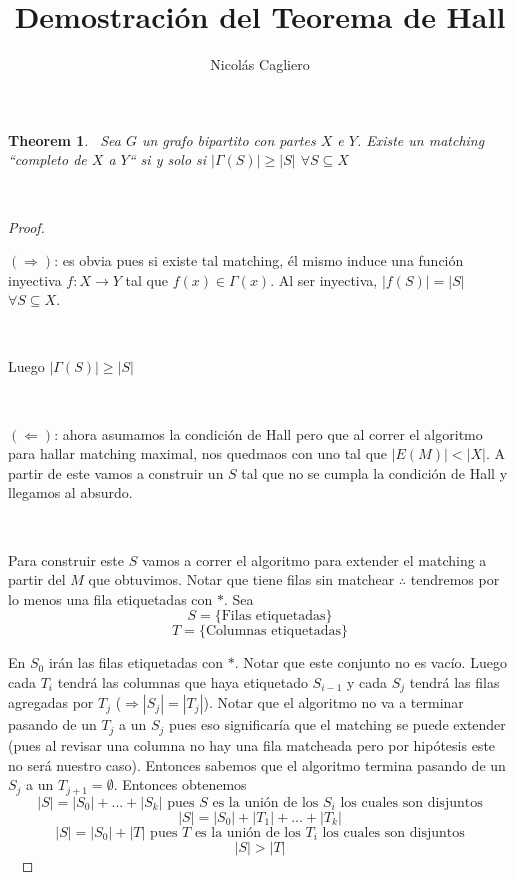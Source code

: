 \documentclass[11pt]{article}
\title{Demostración del Teorema de Hall}
\author{Nicolás Cagliero}
\newtheorem{theorem}{Theorem}
\begin{document}
\maketitle
\begin{theorem}\par
\
Sea $G$ un grafo bipartito con partes $X$ e $Y$. Existe un matching ``completo de $X$ a $Y$`` si y solo si $|\Gamma(S)| \ge |S|$ $\forall S \subseteq X$\par
\

\end{theorem}

\begin{proof} \par
\

$(\Rightarrow)$: es obvia pues si existe tal matching, él mismo induce una función inyectiva $f: X \rightarrow Y$ tal que $f(x) \in \Gamma(x)$. Al ser inyectiva, $|f(S)| = |S|$ $\forall S \subseteq X$.\par
\

Luego $|\Gamma(S)| \ge |S|$\par
\

$(\Leftarrow)$: ahora asumamos la condición de Hall pero que al correr el algoritmo para hallar matching maximal, nos quedmaos con uno tal que $|E(M)| < |X|$. A partir de este vamos a construir un $S$ tal que no se cumpla la condición de Hall y llegamos al absurdo.\par
\

Para construir este $S$ vamos a correr el algoritmo para extender el matching a partir del $M$ que obtuvimos. Notar que tiene filas sin matchear $\therefore$ tendremos por lo menos una fila etiquetadas con $*$. Sea \[S = \{\text{Filas etiquetadas}\}\] \[T = \{\text{Columnas etiquetadas}\}\]

En $S_0$ irán las filas etiquetadas con $*$. Notar que este conjunto no es vacío. Luego cada $T_i$ tendrá las columnas que haya etiquetado $S_{i-1}$ y cada $S_j$ tendrá las filas agregadas por $T_j$ ($\Rightarrow |S_j| = |T_j|$). Notar que el algoritmo no va a terminar pasando de un $T_j$ a un $S_j$ pues eso significaría que el matching se puede extender (pues al revisar una columna no hay una fila matcheada pero por hipótesis este no será nuestro caso). Entonces sabemos que el algoritmo termina pasando de un $S_j$ a un $T_{j+1} = \emptyset$. Entonces obtenemos \[|S| = |S_0| + ... + |S_k| \text{ pues $S$ es la unión de los $S_i$ los cuales son disjuntos}\] \[|S| = |S_0| + |T_1| + ... + |T_k|\] \[|S| = |S_0| + |T| \text{ pues $T$ es la unión de los $T_i$ los cuales son disjuntos}\] \[|S| > |T|\]
\


\end{proof}
\end{document}
